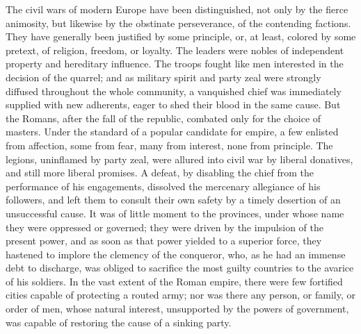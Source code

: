 The civil wars of modern Europe have been distinguished, not only
by the fierce animosity, but likewise by the obstinate
perseverance, of the contending factions. They have generally
been justified by some principle, or, at least, colored by some
pretext, of religion, freedom, or loyalty. The leaders were
nobles of independent property and hereditary influence. The
troops fought like men interested in the decision of the quarrel;
and as military spirit and party zeal were strongly diffused
throughout the whole community, a vanquished chief was
immediately supplied with new adherents, eager to shed their
blood in the same cause. But the Romans, after the fall of the
republic, combated only for the choice of masters. Under the
standard of a popular candidate for empire, a few enlisted from
affection, some from fear, many from interest, none from
principle. The legions, uninflamed by party zeal, were allured
into civil war by liberal donatives, and still more liberal
promises. A defeat, by disabling the chief from the performance
of his engagements, dissolved the mercenary allegiance of his
followers, and left them to consult their own safety by a timely
desertion of an unsuccessful cause. It was of little moment to
the provinces, under whose name they were oppressed or governed;
they were driven by the impulsion of the present power, and as
soon as that power yielded to a superior force, they hastened to
implore the clemency of the conqueror, who, as he had an immense
debt to discharge, was obliged to sacrifice the most guilty
countries to the avarice of his soldiers. In the vast extent of
the Roman empire, there were few fortified cities capable of
protecting a routed army; nor was there any person, or family, or
order of men, whose natural interest, unsupported by the powers
of government, was capable of restoring the cause of a sinking
party.\footnotemark[52]



